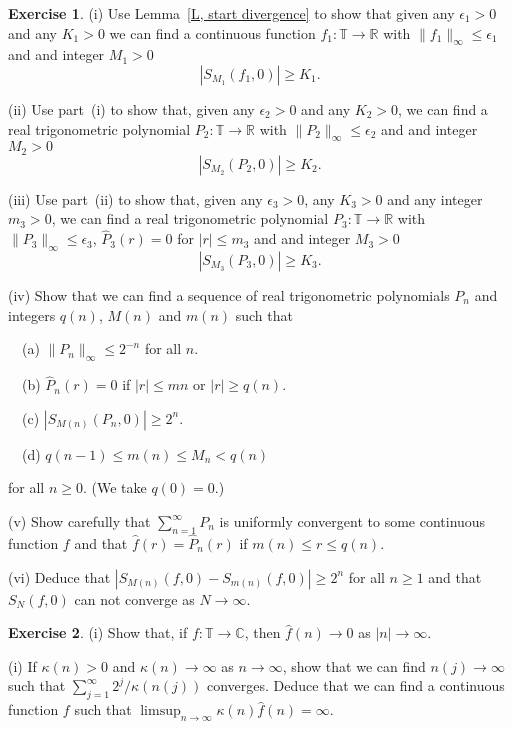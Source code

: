 \documentclass[12pt]{article}
\theoremstyle{definition}
\newtheorem{question}{Exercise}[section]
\begin{document}
\begin{question} (i) Use Lemma~\ref{L, start divergence}
to show that given any $\epsilon_{1}>0$ and any $K_{1}>0$ we can find
a continuous function
$f_{1}:{\mathbb T}\rightarrow{\mathbb R}$ with 
$\|f_{1}\|_{\infty}\leq \epsilon_{1}$ and and integer $M_{1}>0$ 
\[|S_{M_{1}}(f_{1},0)|\geq K_{1}.\]

(ii) Use part~(i) to show that,
given any $\epsilon_{2}>0$ and 
any $K_{2}>0$, we can find
a real trigonometric polynomial
$P_{2}:{\mathbb T}\rightarrow{\mathbb R}$ with 
$\|P_{2}\|_{\infty}\leq \epsilon_{2}$ and and integer $M_{2}>0$ 
\[|S_{M_{2}}(P_{2},0)|\geq K_{2}.\]

(iii) Use part~(ii) to show that, given any $\epsilon_{3}>0$, 
any $K_{3}>0$ and any integer $m_{3}>0$, we can find
a real trigonometric polynomial
$P_{3}:{\mathbb T}\rightarrow{\mathbb R}$ with 
$\|P_{3}\|_{\infty}\leq \epsilon_{3}$,
$\hat{P}_{3}(r)=0$ for $|r|\leq m_{3}$ and and integer $M_{3}>0$ 
\[|S_{M_{3}}(P_{3},0)|\geq K_{3}.\]

(iv) Show that we can find a sequence of real trigonometric
polynomials $P_{n}$ and integers $q(n)$, $M(n)$ and $m(n)$ such that

\ \ (a) $\|P_{n}\|_{\infty}\leq 2^{-n}$ for all $n$.

\ \ (b) $\hat{P}_{n}(r)=0$ if $|r|\leq m{n}$ or $|r|\geq q(n)$.

\ \ (c) $|S_{M(n)}(P_{n},0)|\geq 2^{n}$.

\ \ (d) $q(n-1)\leq m(n)\leq M_{n}<q(n)$

\noindent for all $n\geq 0$. (We take $q(0)=0$.)

(v) Show carefully that $\sum_{n=1}^{\infty}P_{n}$ is uniformly
convergent to some continuous function $f$ and that
$\hat{f}(r)=\hat{P}_{n}(r)$ if $m(n)\leq r\leq q(n)$.

(vi) Deduce that $|S_{M(n)}(f,0)-S_{m(n)}(f,0)|\geq 2^{n}$
for all $n\geq 1$ and that $S_{N}(f,0)$ can not converge as
$N\rightarrow\infty$.
\end{question}
\begin{question} (i) Show that, if $f:{\mathbb T}\rightarrow{\mathbb C}$,
then $\hat{f}(n)\rightarrow 0$ as $|n|\rightarrow\infty$. 

(i) If $\kappa(n)>0$ and
$\kappa(n)\rightarrow \infty$ as $n\rightarrow\infty$,
show that we can find $n(j)\rightarrow\infty$
such that $\sum_{j=1}^{\infty}2^{j}/\kappa(n(j))$ converges.
Deduce that
we can find a continuous function $f$
such that $\limsup_{n\rightarrow\infty}\kappa(n)\hat{f}(n)=\infty$.
\end{question}
\end{document}
